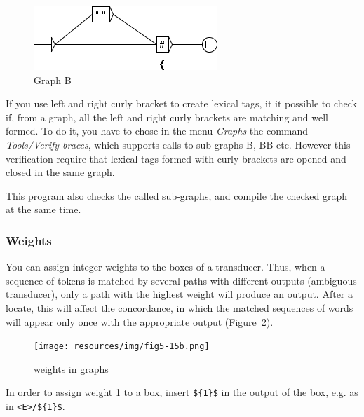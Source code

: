 \begin{figure}[!ht]
\begin{center}
\includegraphics[width=262px]{resources/img/B.png}
\caption{Graph B \label{fig-graphe-B}}
\end{center}
\end{figure}

If you use left and right curly bracket to create lexical tags, it it possible to check if, from a graph, all the left and right curly brackets are matching and well formed. To do it, you have to chose in the menu \textit{Graphs} the command \textit{Tools/Verify braces}, which supports calls to sub-graphs B, BB etc. However this verification require that lexical tags formed with curly brackets are opened and closed in the same graph.

This program also checks the called sub-graphs, and compile the checked graph at the same time.


\subsubsection{Weights}
You can assign integer weights to the boxes of a transducer.
Thus, when a sequence of tokens is matched by several paths with different outputs 
(ambiguous transducer), only a path with the highest weight will produce an output. 
After a locate, this will affect the concordance, in which 
the matched sequences of words will appear only once with the appropriate output
(Figure~\ref{fig-weights-in-graphs}).

\begin{figure}[!ht]
\begin{center}
\texttt{[image: resources/img/fig5-15b.png]}
\caption{weights in graphs \label{fig-weights-in-graphs}}
\end{center}
\end{figure}

\bigskip
\noindent In order to assign weight 1 to a box, insert \verb+${1}$+
in the output of the box, e.g. as in \verb+<E>/${1}$+.


